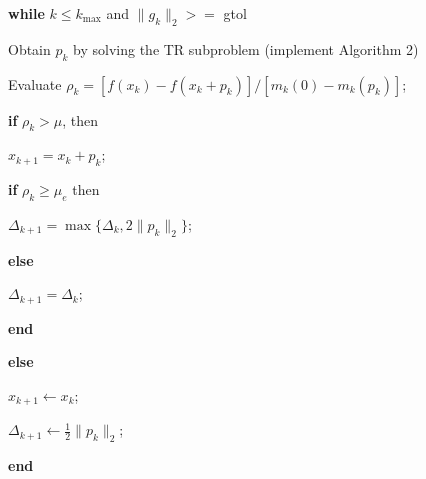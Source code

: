 \documentclass[11pt]{article}
\begin{document}
\vspace{-.15cm}

\quad \textbf{while} $k \le k_{\max}$ and $\|g_k\|_2 >= $ gtol

\vspace{-.15cm}

\quad \qquad Obtain $p_k$ by solving the TR subproblem (implement
Algorithm 2)

\vspace{-.15cm}

\quad \qquad Evaluate $\rho_k = [ f(x_k) - f(x_k+p_k) ] / [m_k(0) - m_k(p_k) ]$;

\vspace{-.15cm}

\quad \qquad \textbf{if} $\rho_k > \mu$, then

\vspace{-.15cm}

\quad \qquad \qquad $x_{k+1} = x_k + p_k$;

\vspace{-.15cm}

\quad \qquad \qquad \textbf{if} $\rho_k \ge \mu_e$ then

\vspace{-.15cm}

\quad \qquad \qquad \qquad $\Delta_{k+1} = \max \{ \Delta_k, 2\|p_k \|_2 \}$;

\vspace{-.15cm}

\quad \qquad \qquad \textbf{else}

\vspace{-.15cm}

\quad \qquad \qquad \qquad $\Delta_{k+1} = \Delta_k$;

\vspace{-.15cm}

\quad \qquad \qquad \textbf{end}

\vspace{-.15cm}

\quad \qquad \textbf{else}

\vspace{-.15cm}

\quad \qquad \qquad $x_{k+1} \leftarrow x_k$;

\vspace{-.15cm}

\quad \qquad \qquad $\Delta_{k+1} \leftarrow \frac{1}{2}\|p_k\|_2$;

\vspace{-.15cm}

\quad \qquad \textbf{end}
\end{document}
